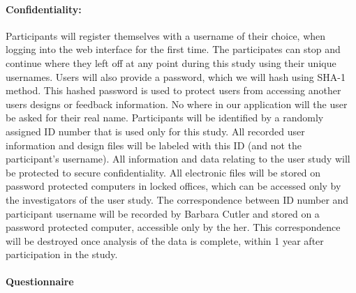 \documentclass[12pt]{article}
\begin{document}
\paragraph{Confidentiality:} 
%
Participants will register themselves with a username of their choice,
when logging into the web interface for the first time. 
The participates can stop and continue where they left off at any point during this study using their
unique usernames. Users will also provide a password, which we will hash using SHA-1 method. 
This hashed password is used to protect users from accessing another users designs or 
feedback information. No where in our application will the user be asked for their real 
name. Participants will be identified by a randomly assigned ID number that is used only for 
this study. All recorded user information and design files will be labeled with this ID 
(and not the participant's username). All information and data relating to the user study 
will be protected to secure confidentiality. All electronic files will be stored on password 
protected computers in locked offices, which can be accessed only by the investigators of 
the user study. The correspondence between ID number and participant username will be recorded 
by Barbara Cutler and stored on a password protected computer, accessible only by the her. 
This correspondence will be destroyed once analysis of the data is complete, within 1 year 
after participation in the study.

\newpage

\paragraph{Questionnaire} 
\end{document}
